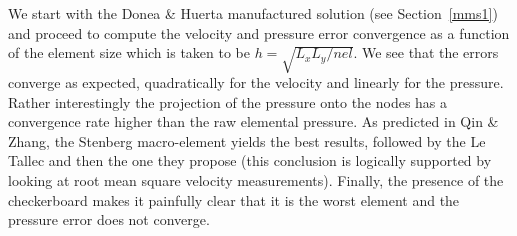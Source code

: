 We start with the Donea \& Huerta manufactured solution (see Section~\ref{mms1}) and 
proceed to compute the velocity and pressure error convergence as a function of the 
element size which is taken to be $h = \sqrt{L_xL_y/nel}$. We see that 
the errors converge as expected, quadratically for the velocity and linearly for the pressure.
Rather interestingly the projection of the pressure onto the nodes has a convergence rate 
higher than the raw elemental pressure. As predicted in Qin \& Zhang, the Stenberg macro-element 
yields the best results, followed by the Le Tallec and then the one they propose (this conclusion 
is logically supported by looking at root mean square velocity measurements). 
Finally, the presence of the checkerboard makes it painfully clear that it is the worst element 
and the pressure error does not converge.  

